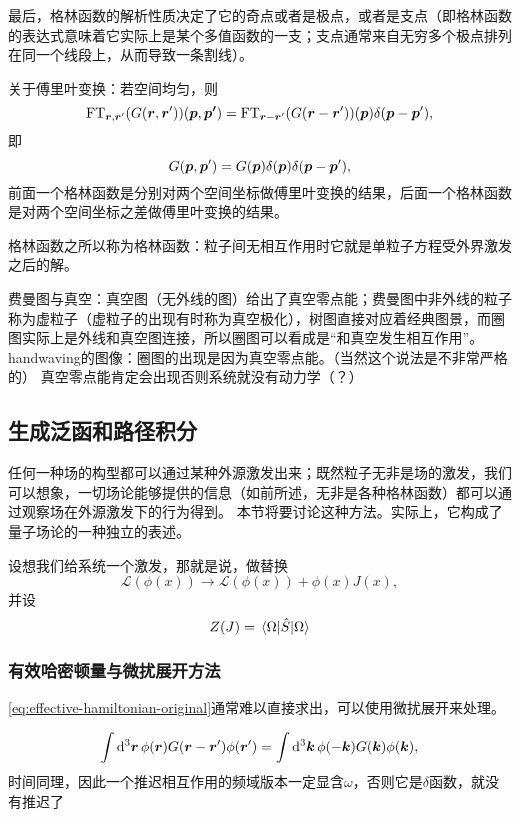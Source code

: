 \documentclass[hyperref, UTF8, a4paper]{ctexart}
\begin{document}
最后，格林函数的解析性质决定了它的奇点或者是极点，或者是支点（即格林函数的表达式意味着它实际上是某个多值函数的一支；支点通常来自无穷多个极点排列在同一个线段上，从而导致一条割线）。

关于傅里叶变换：若空间均匀，则
\[
    \text{FT}_{\vb*{r}, \vb*{r}'}(G(\vb*{r}, \vb*{r}'))(\vb*{p}, \vb*{p'}) = \text{FT}_{\vb*{r}-\vb*{r}'} (G(\vb*{r}-\vb*{r}')) (\vb*{p}) \delta(\vb*{p}-\vb*{p}') ,
\]
即
\[
    G(\vb*{p}, \vb*{p}') = G(\vb*{p}) \delta(\vb*{p}) \delta(\vb*{p} - \vb*{p}'),
\]
前面一个格林函数是分别对两个空间坐标做傅里叶变换的结果，后面一个格林函数是对两个空间坐标之差做傅里叶变换的结果。

格林函数之所以称为格林函数：粒子间无相互作用时它就是单粒子方程受外界激发之后的解。

费曼图与真空：真空图（无外线的图）给出了真空零点能；费曼图中非外线的粒子称为虚粒子（虚粒子的出现有时称为真空极化），树图直接对应着经典图景，而圈图实际上是外线和真空图连接，所以圈图可以看成是“和真空发生相互作用”。
handwaving的图像：圈图的出现是因为真空零点能。（当然这个说法是不非常严格的）
真空零点能肯定会出现否则系统就没有动力学（？）

\subsection{生成泛函和路径积分}

任何一种场的构型都可以通过某种外源激发出来；既然粒子无非是场的激发，我们可以想象，一切场论能够提供的信息（如前所述，无非是各种格林函数）都可以通过观察场在外源激发下的行为得到。
本节将要讨论这种方法。实际上，它构成了量子场论的一种独立的表述。


设想我们给系统一个激发，那就是说，做替换
\begin{equation}
    \mathcal{L}(\phi(x)) \longrightarrow \mathcal{L}(\phi(x)) + \phi(x) J(x),
\end{equation}
并设
\begin{equation}
    Z(J) = \mel{\Omega}{\hat{S}}{\Omega}
\end{equation}


\subsubsection{有效哈密顿量与微扰展开方法}

\eqref{eq:effective-hamiltonian-original}通常难以直接求出，可以使用微扰展开来处理。

\[
    \int \dd[3]{\vb*{r}} \phi(\vb*{r}) G(\vb*{r} - \vb*{r}') \phi(\vb*{r}') = \int \dd[3]{\vb*{k}} \phi(-\vb*{k}) G(\vb*{k}) \phi(\vb*{k}),
\]
时间同理，因此一个推迟相互作用的频域版本一定显含$\omega$，否则它是$\delta$函数，就没有推迟了
\end{document}
